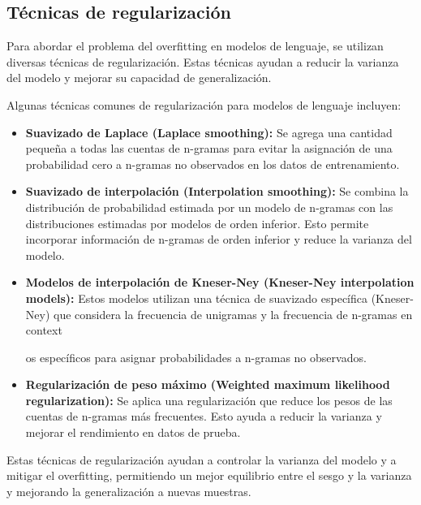 \subsection{Técnicas de regularización}

Para abordar el problema del overfitting en modelos de lenguaje, se utilizan diversas técnicas de regularización. Estas técnicas ayudan a reducir la varianza del modelo y mejorar su capacidad de generalización.

Algunas técnicas comunes de regularización para modelos de lenguaje incluyen:

\begin{itemize}
    \item \textbf{Suavizado de Laplace (Laplace smoothing):} Se agrega una cantidad pequeña a todas las cuentas de n-gramas para evitar la asignación de una probabilidad cero a n-gramas no observados en los datos de entrenamiento.
    
    \item \textbf{Suavizado de interpolación (Interpolation smoothing):} Se combina la distribución de probabilidad estimada por un modelo de n-gramas con las distribuciones estimadas por modelos de orden inferior. Esto permite incorporar información de n-gramas de orden inferior y reduce la varianza del modelo.
    
    \item \textbf{Modelos de interpolación de Kneser-Ney (Kneser-Ney interpolation models):} Estos modelos utilizan una técnica de suavizado específica (Kneser-Ney) que considera la frecuencia de unigramas y la frecuencia de n-gramas en context

os específicos para asignar probabilidades a n-gramas no observados.
    
    \item \textbf{Regularización de peso máximo (Weighted maximum likelihood regularization):} Se aplica una regularización que reduce los pesos de las cuentas de n-gramas más frecuentes. Esto ayuda a reducir la varianza y mejorar el rendimiento en datos de prueba.
\end{itemize}

Estas técnicas de regularización ayudan a controlar la varianza del modelo y a mitigar el overfitting, permitiendo un mejor equilibrio entre el sesgo y la varianza y mejorando la generalización a nuevas muestras.

